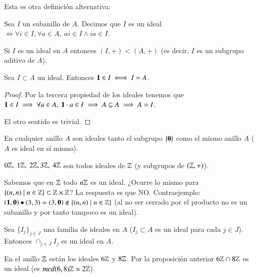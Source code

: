 Esta es otra definición alternativa:

\begin{dfn}
	\label{dfn:idealdorronsoro}
	\cite[p.~197]{dor96} Sea $I$ un subanillo de $A$. Decimos que $I$ es un ideal $\iff \forall i \in I, \forall a \in A,\ ai \in I \land ia \in I$.
\end{dfn}

\begin{pro}
	Si $I$ es un ideal en $A$ entonces $(I, +) < (A, +)$ (es decir, $I$ es un subgrupo aditivo de $A$).
\end{pro}

\begin{pro}
	Sea $I \subset A$ un ideal. Entonces $\mathbf{1} \in I \iff I = A$.
\end{pro}

\begin{proof}
	Por la tercera propiedad de los ideales tenemos que $\mathbf{1} \in I \implies \forall a \in A,\ \mathbf{1} \cdot a \in I \implies A \subseteq A \implies A = I$.
	
	El otro sentido es trivial.
\end{proof}

\begin{ej}
	En cualquier anillo $A$ son ideales tanto el subgrupo $\{\mathbf{0}\}$ como el mismo anillo $A$ ($A$ es ideal en sí mismo).
\end{ej}

\begin{ej}
	$0\mathbb{Z},\ 1\mathbb{Z},\ 2\mathbb{Z}, 3\mathbb{Z},\ 4\mathbb{Z}$ son todos ideales de $\mathbb{Z}$ (y subgrupos de $(\mathbb{Z}, +)$).
\end{ej}

\begin{ej}
	Sabemos que en $\mathbb{Z}$ todo $n\mathbb{Z}$ es un ideal. ¿Ocurre lo mismo para $\{(n,n) \mid n \in \mathbb{Z}\} \subset \mathbb{Z} \times \mathbb{Z}$? La respuesta es que NO. Contraejemplo: $(\mathbf{1},\mathbf{0}) \bullet (3,3) = (3,\mathbf{0}) \notin \{(n,n) \mid n \in \mathbb{Z}\}$ (al no ser cerrado por el producto no es un subanillo y por tanto tampoco es un ideal).
\end{ej}

\begin{pro}
	Sea $\{I_j\}_{j \in J}$ una familia de ideales en $A$ ($I_j \subset A$ es un ideal para cada $j \in J$). Entonces $\cap_{j \in J} I_j$ es un ideal en $A$.
\end{pro}

\begin{ej}
	En el anillo $\mathbb{Z}$ están los ideales $6\mathbb{Z}$ y $8\mathbb{Z}$. Por la proposición anterior $6\mathbb{Z} \cap 8\mathbb{Z}$ es un ideal (es $mcd(6,8)\mathbb{Z} = 2\mathbb{Z}$).
\end{ej}

